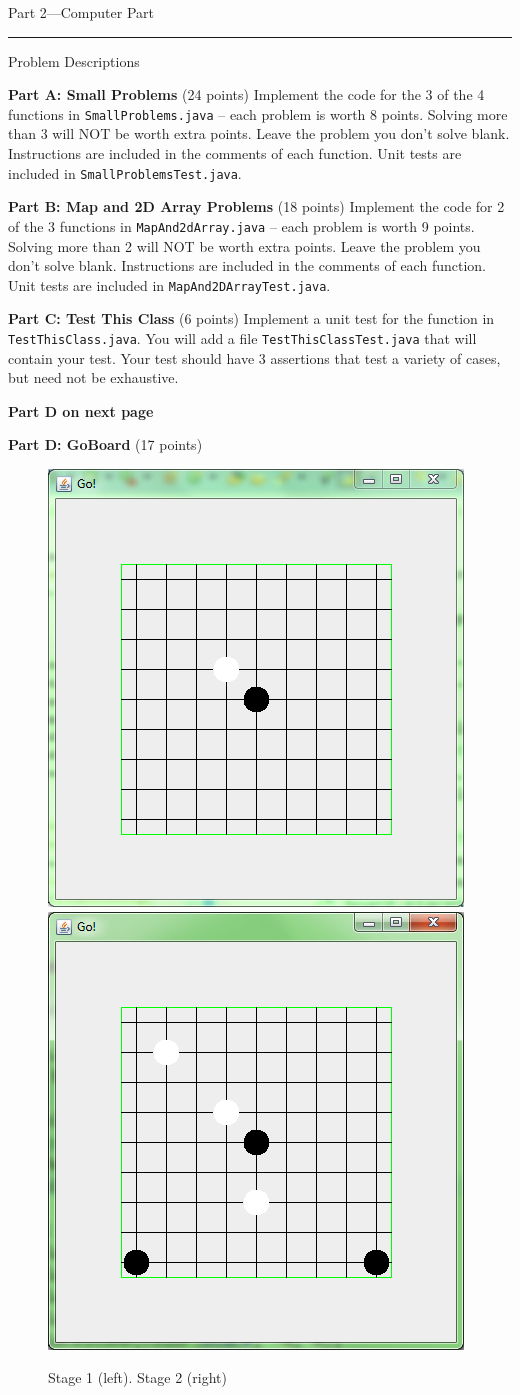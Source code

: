 \documentclass[12pt,twoside]{article}
\newcommand{\code}[1]{\texttt{#1}}
\begin{document}
\clearpage
{\Large Part 2---Computer Part}

\vspace{0.25in}
\hrule
{\large Problem Descriptions}

\textbf{Part A: Small Problems} (24 points) Implement the code for the 3 of the 4 functions in \code{SmallProblems.java} -- each problem is worth 8 points.  Solving more than 3 will NOT be worth extra points.  Leave the problem you don't solve blank.  Instructions are included in the comments of each function.  Unit tests are included in \code{SmallProblemsTest.java}.

\vspace{0.15in}

\textbf{Part B: Map and 2D Array Problems} (18 points) Implement the code for 2 of the 3 functions in \code{MapAnd2dArray.java} -- each problem is worth 9 points.  Solving more than 2 will NOT be worth extra points.  Leave the problem you don't solve blank.  Instructions are included in the comments of each function.  Unit tests are included in \code{MapAnd2DArrayTest.java}.

\vspace{0.15in}


\textbf{Part C: Test This Class} (6 points) Implement a unit test for the function in \code{TestThisClass.java}.  You will add a file \code{TestThisClassTest.java} that will contain your test.  Your test should have 3 assertions that test a variety of cases, but need not be exhaustive.

\vspace{0.15in}

\textbf{Part D on next page}

\clearpage

\textbf{Part D: GoBoard} (17 points) 

\begin{figure}
	\begin{center}
		\includegraphics[width=0.32\linewidth]{stage1.PNG}
		\includegraphics[width=0.32\linewidth]{stage2.PNG}
	\end{center}
	\caption*{Stage 1 (left). Stage 2 (right)}
	\label{fig:one}
\end{figure}
\end{document}
